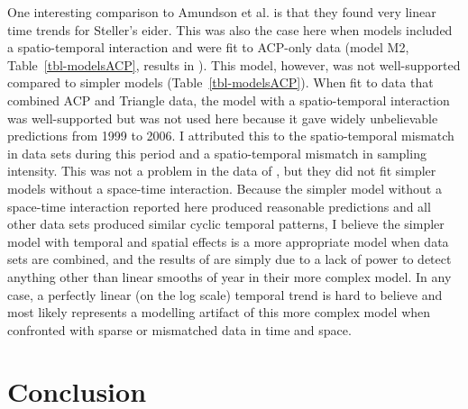\documentclass[
  10pt,
  letterpaper,
]{article}
\begin{document}
One interesting comparison to Amundson et al. \citep{amundson2019} is that they found very linear time trends for Steller's eider. This was also the case here when models included a spatio-temporal interaction and were fit to ACP-only data (model M2, Table~\ref{tbl-modelsACP}, results in
). This model, however, was not well-supported
compared to simpler models (Table~\ref{tbl-modelsACP}). When fit to data
that combined ACP and Triangle data, the model with a spatio-temporal
interaction was well-supported but was not used here because it gave
widely unbelievable predictions from 1999 to 2006. I attributed this to
the spatio-temporal mismatch in data sets during this period and a
spatio-temporal mismatch in sampling intensity. This was not a problem
in the data of \citep{amundson2019}, but they did not fit simpler models
without a space-time interaction. Because the simpler model without a
space-time interaction reported here produced reasonable predictions and
all other data sets produced similar cyclic temporal patterns, I believe
the simpler model with temporal and spatial effects is a more
appropriate model when data sets are combined, and the results of
\citep{amundson2019} are simply due to a lack of power to detect
anything other than linear smooths of year in their more complex model.
In any case, a perfectly linear (on the log scale) temporal trend is
hard to believe and most likely represents a modelling artifact of this
more complex model when confronted with sparse or mismatched data in
time and space.

\section{Conclusion}\label{conclusion}
\end{document}
